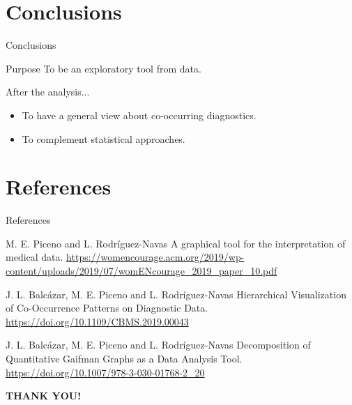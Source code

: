 \documentclass[11pt]{beamer}
\begin{document}
\section{Conclusions}
	\begin{frame}{Conclusions}
		\begin{block}{Purpose}
        To be an exploratory tool from data.
        \end{block}
        
        \begin{block}{After the analysis...}
            \begin{itemize}
                \item To have a general view about co-occurring diagnostics.
                \item To complement statistical approaches.
            \end{itemize}
        \end{block}
	\end{frame}
	
\section{References}
    \begin{frame}{References}
    \begin{thebibliography}{10}
    
    \beamertemplatearticlebibitems
	M. E. Piceno and L. Rodríguez-Navas
	\newblock A graphical tool for the interpretation of medical data.
	\newblock \url{https://womencourage.acm.org/2019/wp-content/uploads/2019/07/womENcourage_2019_paper_10.pdf}
	
	\beamertemplatearticlebibitems
	J. L. Balcázar, M. E. Piceno and L. Rodríguez-Navas
	\newblock Hierarchical Visualization of Co-Occurrence Patterns on Diagnostic Data.
	\newblock \url{https://doi.org/10.1109/CBMS.2019.00043}
	
	\beamertemplatearticlebibitems
	J. L. Balcázar, M. E. Piceno and L. Rodríguez-Navas
	\newblock Decomposition of Quantitative Gaifman Graphs as a Data Analysis Tool.
    \newblock \url{https://doi.org/10.1007/978-3-030-01768-2\_20}
	
    \end{thebibliography}
    \end{frame}

\begin{frame}
    \Huge{\centerline{\textbf{THANK YOU!}}}
\end{frame}
\end{document}
